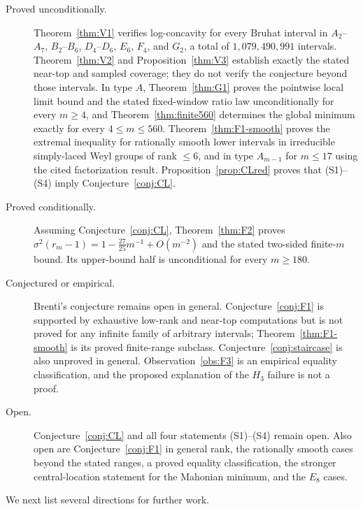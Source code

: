\documentclass[11pt]{amsart}
\theoremstyle{plain}
\theoremstyle{definition}
\theoremstyle{remark}
\begin{document}
\begin{description}
\item[Proved unconditionally.] Theorem~\ref{thm:V1} verifies
log-concavity for every Bruhat interval in
$A_2$--$A_7$, $B_2$--$B_6$, $D_4$--$D_6$, $E_6$, $F_4$, and $G_2$, a
total of $1{,}079{,}490{,}991$ intervals. Theorem~\ref{thm:V2} and
Proposition~\ref{thm:V3} establish exactly the stated near-top and sampled
coverage; they do not verify the conjecture beyond those intervals. In
type $A$, Theorem~\ref{thm:G1} proves the pointwise local limit bound and
the stated fixed-window ratio law unconditionally for every $m\ge4$, and
Theorem~\ref{thm:finite560} determines the global minimum exactly for every
$4\le m\le560$. Theorem~\ref{thm:F1-smooth} proves the extremal inequality
for rationally smooth lower intervals in irreducible simply-laced Weyl
groups of rank $\le6$, and in type $A_{m-1}$ for $m\le17$ using the cited
factorization result. Proposition~\ref{prop:CLred} proves that (S1)--(S4)
imply Conjecture~\ref{conj:CL}.

\item[Proved conditionally.] Assuming Conjecture~\ref{conj:CL},
Theorem~\ref{thm:F2} proves
$\sigma^2(r_m-1)=1-\tfrac{27}{25}m^{-1}+O(m^{-2})$ and the stated
two-sided finite-$m$ bound. Its upper-bound half is unconditional for every
$m\ge180$.

\item[Conjectured or empirical.] Brenti's conjecture remains open in
general. Conjecture~\ref{conj:F1} is supported by exhaustive low-rank and
near-top computations but is not proved for any infinite family of
arbitrary intervals; Theorem~\ref{thm:F1-smooth} is its proved finite-range
subclass. Conjecture~\ref{conj:staircase} is also unproved in general.
Observation~\ref{obs:F3} is an empirical equality classification, and the
proposed explanation of the $H_3$ failure is not a proof.

\item[Open.] Conjecture~\ref{conj:CL} and all four statements (S1)--(S4)
remain open. Also open are Conjecture~\ref{conj:F1} in general rank, the
rationally smooth cases beyond the stated ranges, a proved equality
classification, the stronger central-location statement for the Mahonian
minimum, and the $E_8$ cases.
\end{description}

We next list several directions for further work.
\end{document}

